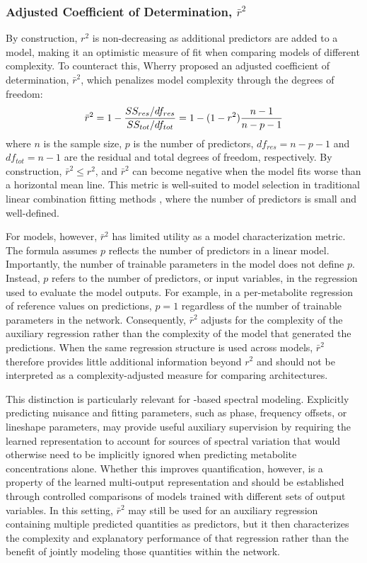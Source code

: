 \subsubsection{Adjusted Coefficient of Determination, \ensuremath{\bar{r}^2}}
\label{sec:Eval:subsec:RegMetrics:subsubsec:adj r2}
By construction, $r^2$ is non-decreasing as additional predictors are added to a model, making it an optimistic measure of fit when comparing models of different complexity. To counteract this, Wherry \cite{Wherry1931} proposed an adjusted coefficient of determination, $\bar{r}^2$, which penalizes model complexity through the degrees of freedom:
\begin{equation}\label{eqn:adjusted r2}
    \Bar{r}^2 = 1 - \frac{SS_{res}/df_{res}}{SS_{tot}/df_{tot}} = 1 - (1 - r^2)\frac{n-1}{n-p-1}
\end{equation}
\noindent where $n$ is the sample size, $p$ is the number of predictors, $df_{res} = n - p - 1$ and $df_{tot} = n - 1$ are the residual and total degrees of freedom, respectively. By construction, $\bar{r}^2 \leq r^2$, and $\bar{r}^2$ can become negative when the model fits worse than a horizontal mean line. This metric is well-suited to model selection in traditional linear combination fitting methods \cite{Olejnik2000,Pirenne2024}, where the number of predictors is small and well-defined.

For \DL models, however, $\bar{r}^2$ has limited utility as a model characterization metric. The formula assumes $p$ reflects the number of predictors in a linear model. Importantly, the number of trainable parameters in the \DL model does not define $p$. Instead, $p$ refers to the number of predictors, or input variables, in the regression used to evaluate the model outputs. For example, in a per-metabolite regression of reference values on \DL predictions, $p=1$ regardless of the number of trainable parameters in the network. Consequently, $\bar{r}^2$ adjusts for the complexity of the auxiliary regression rather than the complexity of the \DL model that generated the predictions. When the same regression structure is used across \DL models, $\bar{r}^2$ therefore provides little additional information beyond $r^2$ and should not be interpreted as a complexity-adjusted measure for comparing \DL architectures.

This distinction is particularly relevant for \DL-based spectral modeling. Explicitly predicting nuisance and fitting parameters, such as phase, frequency offsets, or lineshape parameters, may provide useful auxiliary supervision by requiring the learned representation to account for sources of spectral variation that would otherwise need to be implicitly ignored when predicting metabolite concentrations alone. Whether this improves quantification, however, is a property of the learned multi-output representation and should be established through controlled comparisons of models trained with different sets of output variables. In this setting, $\bar{r}^2$ may still be used for an auxiliary regression containing multiple predicted quantities as predictors, but it then characterizes the complexity and explanatory performance of that regression rather than the benefit of jointly modeling those quantities within the \DL network.

